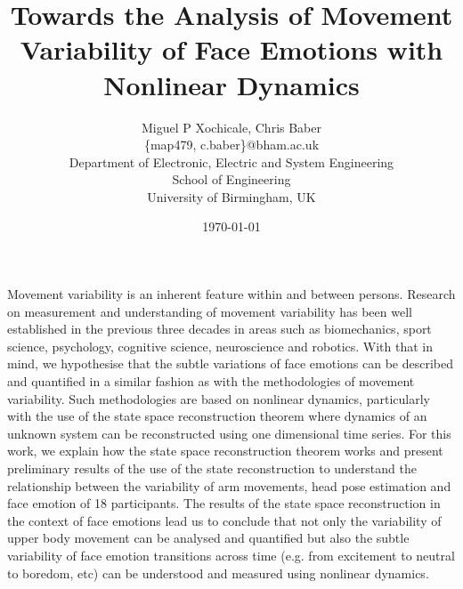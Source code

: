 \documentclass[12pt]{article}
\author{Miguel P Xochicale, Chris Baber \\
\{map479, c.baber\}@bham.ac.uk \\
Department of Electronic, Electric and System Engineering\\
School of Engineering\\
University of Birmingham, UK}
\title{Towards the Analysis of Movement Variability of Face Emotions with
Nonlinear Dynamics}
\date{\today}
\begin{document}
\maketitle

Movement variability is an inherent feature within and between persons.
Research on measurement and understanding of movement variability has been well
established in the previous three decades in areas such as biomechanics,
sport science, psychology, cognitive science, neuroscience and robotics.
With that in mind, we hypothesise that the subtle variations of face emotions
can be described and quantified in a similar fashion as with the methodologies
of movement variability.
Such methodologies are based on nonlinear dynamics, particularly with the use of
the state space reconstruction theorem where dynamics of an unknown system
can be reconstructed using one dimensional time series.
For this work, we explain how the state space reconstruction theorem works and
present preliminary results of the use of the state reconstruction
to understand the relationship between the variability of arm movements, head
pose estimation and face emotion of 18 participants.
The results of the state space reconstruction in the context of face emotions
lead us to conclude that not only the variability of upper body movement can be
analysed and quantified but also the subtle variability of face emotion
transitions across time (e.g. from excitement to neutral to boredom, etc)
can be understood and measured using nonlinear dynamics.
\end{document}
